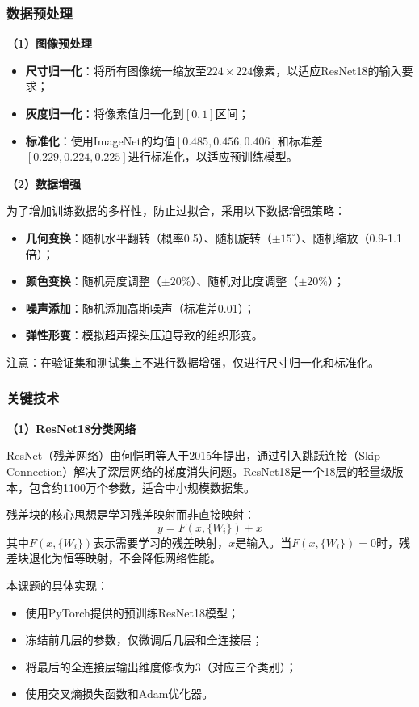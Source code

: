 \documentclass[supercite]{Hust-undergraduate-kaiti}
\theoremstyle{definition}
\begin{document}
\subsubsection{数据预处理}

\textbf{（1）图像预处理}

\begin{itemize}
    \item \textbf{尺寸归一化}：将所有图像统一缩放至$224\times224$像素，以适应ResNet18的输入要求；
    \item \textbf{灰度归一化}：将像素值归一化到$[0, 1]$区间；
    \item \textbf{标准化}：使用ImageNet的均值$[0.485, 0.456, 0.406]$和标准差$[0.229, 0.224, 0.225]$进行标准化，以适应预训练模型。
\end{itemize}

\textbf{（2）数据增强}

为了增加训练数据的多样性，防止过拟合，采用以下数据增强策略：
\begin{itemize}
    \item \textbf{几何变换}：随机水平翻转（概率0.5）、随机旋转（$\pm15^\circ$）、随机缩放（0.9-1.1倍）；
    \item \textbf{颜色变换}：随机亮度调整（$\pm20\%$）、随机对比度调整（$\pm20\%$）；
    \item \textbf{噪声添加}：随机添加高斯噪声（标准差0.01）；
    \item \textbf{弹性形变}：模拟超声探头压迫导致的组织形变。
\end{itemize}

注意：在验证集和测试集上不进行数据增强，仅进行尺寸归一化和标准化。

\subsubsection{关键技术}

\textbf{（1）ResNet18分类网络}

ResNet（残差网络）由何恺明等人于2015年提出，通过引入跳跃连接（Skip Connection）解决了深层网络的梯度消失问题。ResNet18是一个18层的轻量级版本，包含约1100万个参数，适合中小规模数据集。

残差块的核心思想是学习残差映射而非直接映射：
$$y = F(x, \{W_i\}) + x$$
其中$F(x, \{W_i\})$表示需要学习的残差映射，$x$是输入。当$F(x, \{W_i\}) = 0$时，残差块退化为恒等映射，不会降低网络性能。

本课题的具体实现：
\begin{itemize}
    \item 使用PyTorch提供的预训练ResNet18模型；
    \item 冻结前几层的参数，仅微调后几层和全连接层；
    \item 将最后的全连接层输出维度修改为3（对应三个类别）；
    \item 使用交叉熵损失函数和Adam优化器。
\end{itemize}
\end{document}
